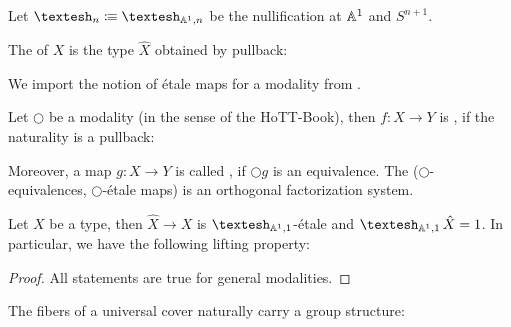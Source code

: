 \begin{definition}
  Let $\shape_n\colonequiv\shape_{\A^1,n}$ be the nullification at $\mathbb{A}^1$ and $S^{n+1}$.
\end{definition}

\begin{definition}
  The  of $X$ is the type $\hat{X}$ obtained by pullback:
  \begin{center}
  \end{center}
\end{definition}

We import the notion of étale maps for a modality from \cite{cherubini_rijke_2021}.

\begin{definition}
  Let $\bigcirc$ be a modality (in the sense of the HoTT-Book),
  then $f:X\to Y$ is , if the naturality is a pullback:
  \begin{center}
  \end{center}
  Moreover, a map $g:X\to Y$ is called ,
  if $\bigcirc g$ is an equivalence.
  The ($\bigcirc$-equivalences, $\bigcirc$-étale maps) is an orthogonal factorization system. 
\end{definition}

\begin{proposition}
  Let $X$ be a type, then $\hat{X}\to X$ is $\shape_{\A^1,1}$-étale and $\shape_{\A^1,1}\hat{X}=1$.
  In particular, we have the following lifting property:
  \begin{center}
  \end{center}
\end{proposition}

\begin{proof}
  All statements are true for general modalities.
\end{proof}

\begin{example}
  The fibers of a universal cover naturally carry a group structure:
  \begin{center}
  \end{center}
\end{example}